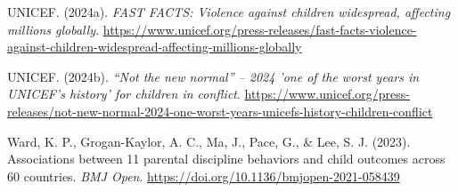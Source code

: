 \documentclass[
  letterpaper,
  DIV=11,
  numbers=noendperiod]{scrartcl}
\newlength{\cslhangindent}
\newenvironment{CSLReferences}[2] %
 {\begin{list}{}{%
  \setlength{\itemindent}{0pt}
  \setlength{\leftmargin}{0pt}
  \setlength{\parsep}{0pt}
  \ifodd #1
   \setlength{\leftmargin}{\cslhangindent}
   \setlength{\itemindent}{-1\cslhangindent}
  \fi
  \setlength{\itemsep}{#2\baselineskip}}}
 {\end{list}}
\begin{document}
\begin{CSLReferences}{1}{0}
UNICEF. (2024a). \emph{FAST FACTS: Violence against children widespread,
affecting millions globally}.
\url{https://www.unicef.org/press-releases/fast-facts-violence-against-children-widespread-affecting-millions-globally}

UNICEF. (2024b). \emph{{``Not the new normal''} -- 2024 'one of the
worst years in UNICEF's history' for children in conflict}.
\url{https://www.unicef.org/press-releases/not-new-normal-2024-one-worst-years-unicefs-history-children-conflict}

Ward, K. P., Grogan-Kaylor, A. C., Ma, J., Pace, G., \& Lee, S. J.
(2023). Associations between 11 parental discipline behaviors and child
outcomes across 60 countries. \emph{BMJ Open}.
\url{https://doi.org/10.1136/bmjopen-2021-058439}

\end{CSLReferences}
\end{document}
